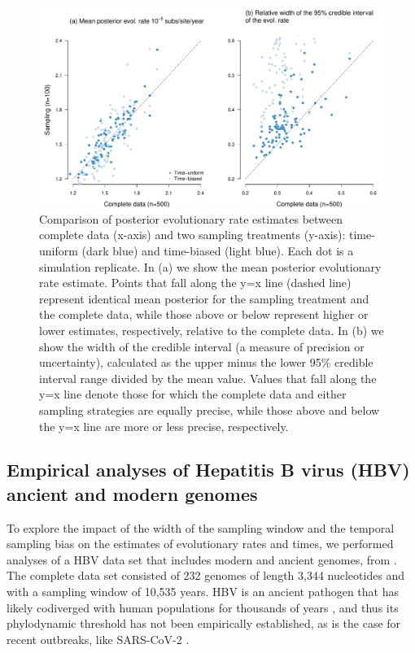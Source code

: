 \documentclass[11pt]{article}
\begin{document}
\begin{figure}[H]
	\begin{center}
		\includegraphics[scale=0.5, angle=0]{sampling_bias_summary_rates.pdf}
		\caption{Comparison of posterior evolutionary rate estimates between complete data (x-axis) and two sampling treatments (y-axis): time-uniform (dark blue) and time-biased (light blue). Each dot is a simulation replicate. In (a) we show the mean posterior evolutionary rate estimate. Points that fall along the y=x line (dashed line) represent identical mean posterior for the sampling treatment and the complete data, while those above or below represent higher or lower estimates, respectively, relative to the complete data. In (b) we show the width of the credible interval (a measure of precision or uncertainty), calculated as the upper minus the lower 95\% credible interval range divided by the mean value. Values that fall along the y=x line denote those for which the complete data and either sampling strategies are equally precise, while those above and below the y=x line are more or less precise, respectively.}
		\label{figure:Fig5}
	\end{center}
\end{figure}

\subsection{Empirical analyses of Hepatitis B virus (HBV) ancient and modern genomes}
To explore the impact of the width of the sampling window and the temporal sampling bias on the estimates of evolutionary rates and times, we performed analyses of a HBV data set that includes modern and ancient genomes, from \cite{kocher2021ten}. The complete data set consisted of 232 genomes of length 3,344 nucleotides and with a sampling window of 10,535 years. HBV is an ancient pathogen that has likely codiverged with human populations for thousands of years \citep{locarnini2021origins, zehender2014enigmatic, paraskevis2013dating, muhlemann2018ancient}, and thus its phylodynamic threshold has not been empirically established, as is the case for recent outbreaks, like SARS-CoV-2 \citep{duchene2020temporal}. 
\end{document}
